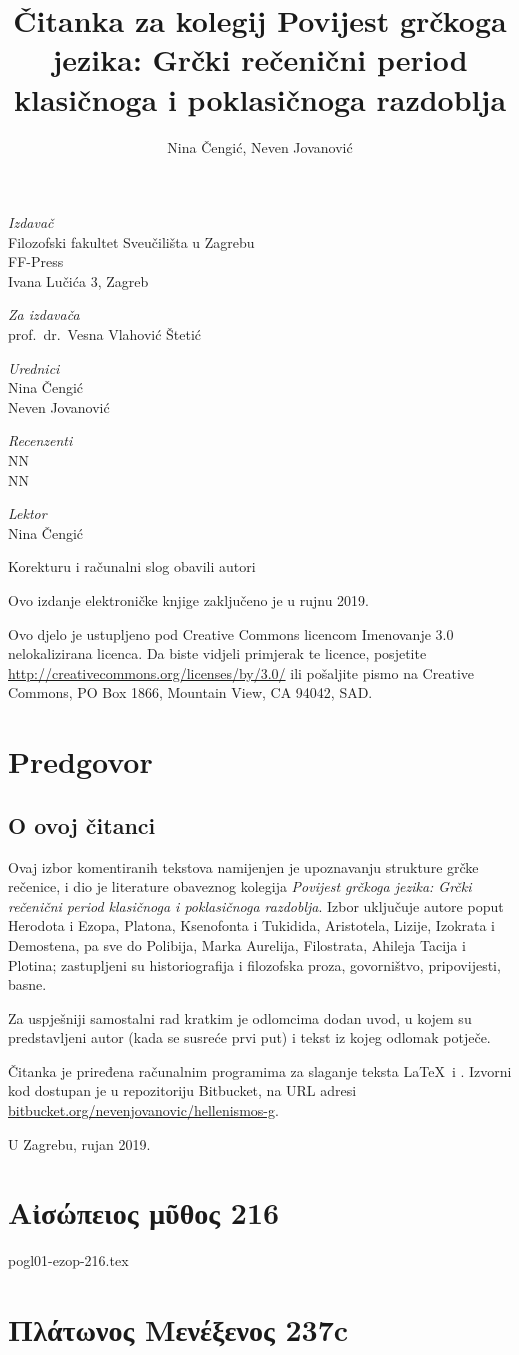 \documentclass[a4paper,12pt,twoside]{report}
\newcommand{\subtitle}[1]{%
  \posttitle{%
    \par\end{center}
    \begin{center}\large#1\end{center}
    \vskip0.5em}%
}
\def\secondpage{\clearpage\null\vfill
\pagestyle{empty}
\begin{minipage}[b]{0.9\textwidth}
\begin{center}
\textit{Izdavač}\\
Filozofski fakultet Sveučilišta u Zagrebu\\
FF-Press\\
Ivana Lučića 3, Zagreb

\bigskip

\textit{Za izdavača}\\
prof.\ dr.\ Vesna Vlahović Štetić

\bigskip

\textit{Urednici}\\
Nina Čengić\\
Neven Jovanović

\bigskip

\textit{Recenzenti}\\
NN\\
NN

\bigskip

\textit{Lektor}\\
Nina Čengić

\bigskip

Korekturu i računalni slog obavili autori

\bigskip


\bigskip

Ovo izdanje elektroničke knjige zaključeno je u rujnu 2019.




\end{center}
\footnotesize\raggedright
\setlength{\parskip}{0.5\baselineskip}
\noindent Ovo djelo je ustupljeno pod Creative Commons licencom Imenovanje 3.0 nelokalizirana licenca. Da biste vidjeli primjerak te licence, posjetite \url{http://creativecommons.org/licenses/by/3.0/} ili pošaljite pismo na Creative Commons, PO Box 1866, Mountain View, CA 94042, SAD. 
\end{minipage}
\vspace*{3\baselineskip}
\rfoot{\thepage}}
\begin{document}
\title{Čitanka za kolegij Povijest grčkoga jezika: Grčki rečenični period klasičnoga i poklasičnoga razdoblja}
\author{Nina Čengić, Neven Jovanović}
\date{}
\secondpage


\cleardoublepage
\setcounter{page}{2}
\thispagestyle{empty}




\chapter*{Predgovor}
\label{chap:predgovor}

\section*{O ovoj čitanci}

Ovaj izbor komentiranih tekstova namijenjen je upoznavanju strukture grčke rečenice, i dio je literature obaveznog kolegija \textit{Povijest grčkoga jezika: Grčki rečenični period klasičnoga i poklasičnoga razdoblja}. Izbor uključuje autore poput Herodota i Ezopa, Platona, Ksenofonta i Tukidida, Aristotela, Lizije, Izokrata i Demostena, pa sve do Polibija, Marka Aurelija, Filostrata, Ahileja Tacija i Plotina; zastupljeni su historiografija i filozofska proza, govorništvo, pripovijesti, basne.

Za uspješniji samostalni rad kratkim je odlomcima dodan uvod, u kojem su predstavljeni autor (kada se susreće prvi put) i tekst iz kojeg odlomak potječe.

Čitanka je priređena računalnim programima za slaganje teksta \LaTeX\ i \XeLaTeX. Izvorni kod dostupan je u repozitoriju Bitbucket, na URL adresi \href{https://bitbucket.org/nevenjovanovic/hellenismos-g}{bitbucket.org/nevenjovanovic/hellenismos-g}.

\medskip

U Zagrebu, rujan 2019.

\newpage

\tableofcontents

\newpage

\chapter[Αἰσώπειος μῦθος 216]{\textgreek[variant=ancient]{Αἰσώπειος μῦθος} 216}

{pogl01-ezop-216.tex}

\chapter[Πλάτωνος Μενέξενος]{\textgreek[variant=ancient]{Πλάτωνος Μενέξενος} 237c}
\end{document}
